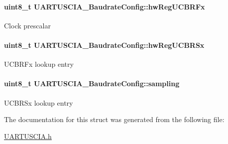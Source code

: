 \paragraph[{hw\-Reg\-U\-C\-B\-R\-Fx}]{\setlength{\rightskip}{0pt plus 5cm}uint8\-\_\-t U\-A\-R\-T\-U\-S\-C\-I\-A\-\_\-\-Baudrate\-Config\-::hw\-Reg\-U\-C\-B\-R\-Fx}\label{struct_u_a_r_t_u_s_c_i_a___baudrate_config_ad0e8c8dfaee0456a272bcaf7625b5998}
Clock prescalar 
\paragraph[{hw\-Reg\-U\-C\-B\-R\-Sx}]{\setlength{\rightskip}{0pt plus 5cm}uint8\-\_\-t U\-A\-R\-T\-U\-S\-C\-I\-A\-\_\-\-Baudrate\-Config\-::hw\-Reg\-U\-C\-B\-R\-Sx}\label{struct_u_a_r_t_u_s_c_i_a___baudrate_config_a638b5df1c71e9495f489a1e4ea5aa2c4}
U\-C\-B\-R\-Fx lookup entry 
\paragraph[{sampling}]{\setlength{\rightskip}{0pt plus 5cm}uint8\-\_\-t U\-A\-R\-T\-U\-S\-C\-I\-A\-\_\-\-Baudrate\-Config\-::sampling}\label{struct_u_a_r_t_u_s_c_i_a___baudrate_config_a6c78a1a4babef0a3723616d2ae4e7b9e}
U\-C\-B\-R\-Sx lookup entry 

The documentation for this struct was generated from the following file\-:\begin{DoxyCompactItemize}
\item 
\hyperlink{_u_a_r_t_u_s_c_i_a_8h}{U\-A\-R\-T\-U\-S\-C\-I\-A.\-h}\end{DoxyCompactItemize}
